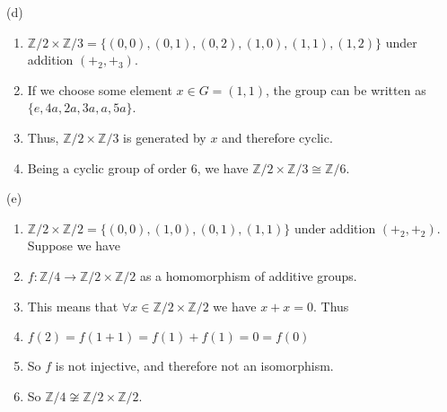 (d)
\begin{enumerate}[nosep]
\item[] $\mathbb{Z}/2 \times \mathbb{Z}/3 = \{(0,0),(0,1),(0,2),(1,0),(1,1),(1,2)\}$ under addition $(+_2,+_3)$.
\item[] If we choose some element $x \in G = (1,1)$, the group can be written as $\{e,4a,2a,3a,a,5a\}$.
\item[] Thus, $\mathbb{Z}/2 \times \mathbb{Z}/3$ is generated by $x$ and therefore cyclic.
\item[] Being a cyclic group of order 6, we have $\mathbb{Z}/2 \times \mathbb{Z}/3 \cong \mathbb{Z}/6$.
\end{enumerate}

(e)
\begin{enumerate}[nosep]
\item[] $\mathbb{Z}/2 \times \mathbb{Z}/2 = \{(0,0),(1,0),(0,1),(1,1)\}$ under addition $(+_2,+_2)$. Suppose we have
\item[] $f:\mathbb{Z}/4 \to \mathbb{Z}/2 \times \mathbb{Z}/2$ as a homomorphism of additive groups.
\item[] This means that $\forall x \in \mathbb{Z}/2 \times \mathbb{Z}/2$ we have $x + x = 0$. Thus
\item[] $f(2) = f(1 + 1) = f(1) + f(1) = 0 = f(0)$
\item[] So $f$ is not injective, and therefore not an isomorphism.
\item[] So $\mathbb{Z}/4 \not\cong \mathbb{Z}/2 \times \mathbb{Z}/2$.
\end{enumerate}

